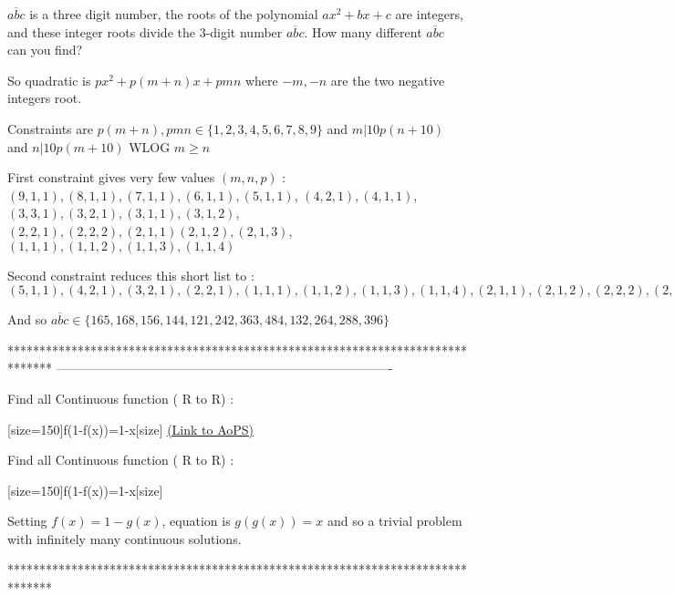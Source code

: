 \begin{solution}
	\begin{tcolorbox}$\overline{abc}$ is a three digit number, the roots of the polynomial $ ax^2 + bx +c $  are integers, and these integer roots divide the $3$-digit number $\overline{abc}$. How many different $\overline{abc}$ can you find?\end{tcolorbox}
So quadratic is $px^2+p(m+n)x+pmn$ where $-m,-n$ are the two negative integers root.

Constraints are $p(m+n),pmn\in\{1,2,3,4,5,6,7,8,9\}$ and $m|10p(n+10)$ and $n|10p(m+10)$
WLOG $m\ge n$

First constraint gives very few values $(m,n,p)$ : 
$(9,1,1),(8,1,1),(7,1,1),(6,1,1),(5,1,1)$,
$(4,2,1),(4,1,1)$,
$(3,3,1),(3,2,1),(3,1,1),(3,1,2)$,
$(2,2,1),(2,2,2),(2,1,1)(2,1,2),(2,1,3)$,
$(1,1,1),(1,1,2),(1,1,3),(1,1,4)$

Second constraint reduces this short list to :
$(5,1,1),(4,2,1),(3,2,1),(2,2,1),(1,1,1),(1,1,2),(1,1,3),(1,1,4),(2,1,1),(2,1,2),(2,2,2),(2,1,3)$

And so $\boxed{\overline{abc}\in\{165,168,156,144,121,242,363,484,132,264,288,396\}}$
\end{solution}
*******************************************************************************
-------------------------------------------------------------------------------

\begin{problem}
	Find all Continuous function ( R to R) :

[size=150]f(1-f(x))=1-x[\/size]
	\flushright \href{https://artofproblemsolving.com/community/q1h583154}{(Link to AoPS)}
\end{problem}



\begin{solution}
	\begin{tcolorbox}Find all Continuous function ( R to R) :

[size=150]f(1-f(x))=1-x[\/size]\end{tcolorbox}
Setting $f(x)=1-g(x)$, equation is $g(g(x))=x$ and so a trivial problem with infinitely many continuous solutions.
\end{solution}
*******************************************************************************
